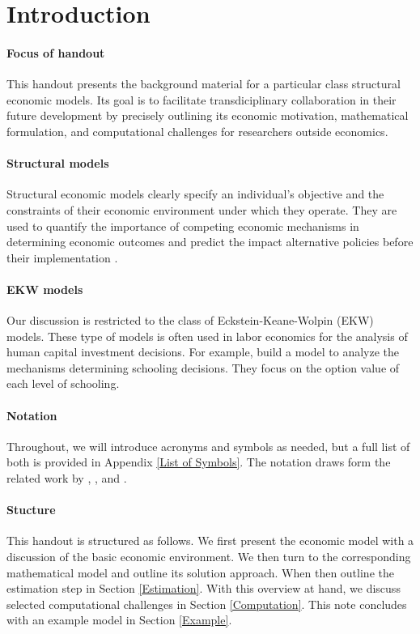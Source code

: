 \section{Introduction}
\paragraph{Focus of handout} This handout presents the background material for a particular class structural economic models. Its goal is to facilitate transdiciplinary collaboration in their future development by precisely outlining its economic motivation, mathematical formulation, and computational challenges for researchers outside economics.

\paragraph{Structural models}  Structural economic models clearly specify an individual's objective and the constraints of their economic environment under which they operate. They are used to quantify the importance of competing economic mechanisms in determining economic outcomes and predict the impact alternative policies before their implementation \citep{Wolpin.2013}.

\paragraph{EKW models} Our discussion is restricted to the class of Eckstein-Keane-Wolpin (EKW) models. These type of models is often used in labor economics for the analysis of human capital investment decisions. For example, \citet{Bhuller.2018} build a model to analyze the mechanisms determining schooling decisions. They focus on the option value of each level of schooling.

\paragraph{Notation} Throughout, we will introduce acronyms and symbols as needed, but a full list of both is provided in Appendix \ref{List of Symbols}. The notation draws form the related work by \cite{Puterman.1994}, \cite{Aguirregabiria.2010}, and \cite{Arcidiacono.2011}.

\paragraph{Stucture} This handout is structured as follows. We first present the economic model with a discussion of the basic economic environment. We then turn to the corresponding mathematical model and outline its solution approach. When then outline the estimation step in Section \ref{Estimation}. With this overview at hand, we discuss selected computational challenges in Section \ref{Computation}. This note concludes with an example model in Section \ref{Example}.

